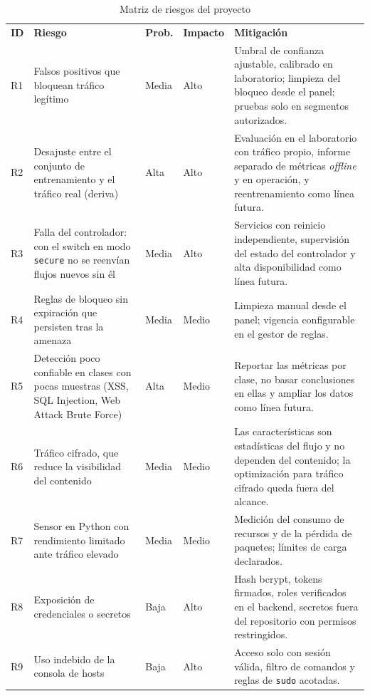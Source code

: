 \clearpage
\begin{table}[H]
\centering
\footnotesize
\renewcommand{\arraystretch}{1.15}
\setlength{\tabcolsep}{3.5pt}
\caption{{\fontsize{11pt}{13}\selectfont Matriz de riesgos del proyecto}}
\label{tbl:riesgos}
\begin{tabular}{@{}L{0.9cm}L{4.4cm}L{1.3cm}L{1.45cm}L{7.05cm}@{}}
\textbf{ID} & \textbf{Riesgo} & \textbf{Prob.} & \textbf{Impacto} & \textbf{Mitigación} \\
R1 & Falsos positivos que bloquean tráfico legítimo & Media & Alto & Umbral de confianza ajustable, calibrado en laboratorio; limpieza del bloqueo desde el panel; pruebas solo en segmentos autorizados. \\
R2 & Desajuste entre el conjunto de entrenamiento y el tráfico real (deriva) & Alta & Alto & Evaluación en el laboratorio con tráfico propio, informe separado de métricas \emph{offline} y en operación, y reentrenamiento como línea futura. \\
R3 & Falla del controlador: con el switch en modo \texttt{secure} no se reenvían flujos nuevos sin él & Media & Alto & Servicios con reinicio independiente, supervisión del estado del controlador y alta disponibilidad como línea futura. \\
R4 & Reglas de bloqueo sin expiración que persisten tras la amenaza & Media & Medio & Limpieza manual desde el panel; vigencia configurable en el gestor de reglas. \\
R5 & Detección poco confiable en clases con pocas muestras (XSS, SQL Injection, Web Attack Brute Force) & Alta & Medio & Reportar las métricas por clase, no basar conclusiones en ellas y ampliar los datos como línea futura. \\
R6 & Tráfico cifrado, que reduce la visibilidad del contenido & Media & Medio & Las características son estadísticas del flujo y no dependen del contenido; la optimización para tráfico cifrado queda fuera del alcance. \\
R7 & Sensor en Python con rendimiento limitado ante tráfico elevado & Media & Medio & Medición del consumo de recursos y de la pérdida de paquetes; límites de carga declarados. \\
R8 & Exposición de credenciales o secretos & Baja & Alto & Hash bcrypt, tokens firmados, roles verificados en el backend, secretos fuera del repositorio con permisos restringidos. \\
R9 & Uso indebido de la consola de hosts & Baja & Alto & Acceso solo con sesión válida, filtro de comandos y reglas de \texttt{sudo} acotadas. \\
\end{tabular}
\end{table}

